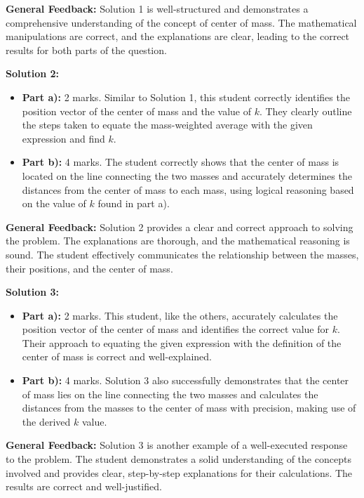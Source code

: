 \documentclass[a4paper,11pt]{article}
\begin{document}
\textbf{General Feedback:} Solution 1 is well-structured and demonstrates a comprehensive understanding of the concept of center of mass. The mathematical manipulations are correct, and the explanations are clear, leading to the correct results for both parts of the question.

\textbf{Solution 2:}

\begin{itemize}
    \item \textbf{Part a):} 2 marks. Similar to Solution 1, this student correctly identifies the position vector of the center of mass and the value of \( k \). They clearly outline the steps taken to equate the mass-weighted average with the given expression and find \( k \).
    \item \textbf{Part b):} 4 marks. The student correctly shows that the center of mass is located on the line connecting the two masses and accurately determines the distances from the center of mass to each mass, using logical reasoning based on the value of \( k \) found in part a).
\end{itemize}

\textbf{General Feedback:} Solution 2 provides a clear and correct approach to solving the problem. The explanations are thorough, and the mathematical reasoning is sound. The student effectively communicates the relationship between the masses, their positions, and the center of mass.

\textbf{Solution 3:}

\begin{itemize}
    \item \textbf{Part a):} 2 marks. This student, like the others, accurately calculates the position vector of the center of mass and identifies the correct value for \( k \). Their approach to equating the given expression with the definition of the center of mass is correct and well-explained.
    \item \textbf{Part b):} 4 marks. Solution 3 also successfully demonstrates that the center of mass lies on the line connecting the two masses and calculates the distances from the masses to the center of mass with precision, making use of the derived \( k \) value.
\end{itemize}

\textbf{General Feedback:} Solution 3 is another example of a well-executed response to the problem. The student demonstrates a solid understanding of the concepts involved and provides clear, step-by-step explanations for their calculations. The results are correct and well-justified.
\end{document}
